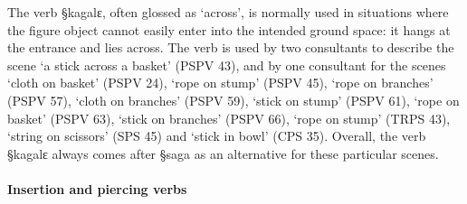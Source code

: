 The verb {\S kagalɛ}, often glossed as `across',  is normally used in situations
where the figure object  cannot easily enter into the intended ground space: it
hangs at the entrance and lies across. The verb is used by two consultants to
describe the scene `a stick across a basket' (PSPV 43),  and by one consultant
for  the scenes `cloth on basket' (PSPV 24), `rope on stump' (PSPV 45), `rope on
branches' (PSPV 57),  `cloth on branches' (PSPV 59),  `stick on stump' (PSPV
61), `rope on basket' (PSPV 63), `stick on branches'  (PSPV 66), `rope on stump'
(TRPS 43),  `string on scissors' (SPS 45) and `stick in bowl' (CPS 35).       
Overall, the verb {\S kagalɛ}  always comes after {\S saga} as an alternative
for these particular scenes. 
 


\paragraph{Insertion and piercing verbs}
\label{sec:SPA-cover-v}


